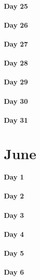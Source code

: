 \documentclass[UTF8,a4paper,8pt]{ctexart}
\begin{document}
 	 \paragraph{Day 25      \quad     }
 	 \paragraph{Day 26      \quad     }
 	 \paragraph{Day 27      \quad     }
 	 \paragraph{Day 28      \quad     }
 	 \paragraph{Day 29      \quad     }   
 	 \paragraph{Day 30      \quad     }
 	 \paragraph{Day 31      \quad     }
 	 
\section{June}
 	 \paragraph{Day 1       \quad     }
 	 \paragraph{Day 2       \quad     }
 	 \paragraph{Day 3       \quad     }
 	 \paragraph{Day 4       \quad     }
 	 \paragraph{Day 5       \quad     }
 	 \paragraph{Day 6       \quad     }
\end{document}

